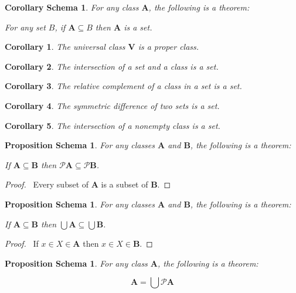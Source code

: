 \documentclass{book}
\let\qed\relax
\newtheorem{props}[ax]{Proposition Schema}
\newtheorem{cor}{Corollary}[ax]
\newtheorem{cors}{Corollary Schema}[ax]
\theoremstyle{definition}
\begin{document}
\begin{cors}
For any class $\mathbf{A}$, the following is a theorem:

For any set $B$, if $\mathbf{A} \subseteq B$ then $\mathbf{A}$ is a set.
\end{cors}

\begin{cor}
The universal class $\mathbf{V}$ is a proper class.
\end{cor}

\begin{cor}
The intersection of a set and a class is a set.
\end{cor}

\begin{cor}
The relative complement of a class in a set is a set.
\end{cor}

\begin{cor}
The symmetric difference of two sets is a set.
\end{cor}

\begin{cor}
The intersection of a nonempty class is a set.
\end{cor}

\begin{props}
\label{prop:powermono}
For any classes $\mathbf{A}$ and $\mathbf{B}$, the following is a theorem:

If $\mathbf{A} \subseteq \mathbf{B}$ then $\mathcal{P} \mathbf{A} \subseteq \mathcal{P} \mathbf{B}$.
\end{props}

\begin{proof}
\pf\ Every subset of $\mathbf{A}$ is a subset of $\mathbf{B}$. \qed
\end{proof}

\begin{props}
\label{prop:unionmonotone}
For any classes $\mathbf{A}$ and $\mathbf{B}$, the following is a theorem:

If $\mathbf{A} \subseteq \mathbf{B}$ then $\bigcup \mathbf{A} \subseteq \bigcup \mathbf{B}$.
\end{props}

\begin{proof}
\pf\ If $x \in X \in \mathbf{A}$ then $x \in X \in \mathbf{B}$. \qed
\end{proof}

\begin{props}
\label{prop:UPA}
For any class $\mathbf{A}$, the following is a theorem:

\[ \mathbf{A} = \bigcup \mathcal{P} \mathbf{A} \]
\end{props}
\end{document}
